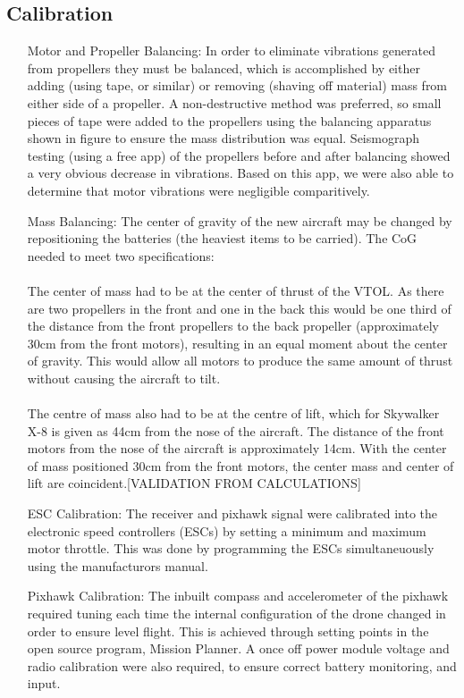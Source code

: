	

\subsection{Calibration}
\begin{itemize}
	\item[Motor and Propeller Balancing:] In order to eliminate vibrations generated from propellers they must be balanced, which is accomplished by either adding (using tape, or similar) or removing (shaving off material) mass from either side of a propeller. A non-destructive method was preferred, so small pieces of tape were added to the propellers using the balancing apparatus shown in figure  to ensure the mass distribution was equal.  Seismograph testing (using a free app) of the propellers before and after balancing showed a very obvious decrease in vibrations. Based on this app, we were also able to determine that motor vibrations were negligible comparitively.
	\item[Mass Balancing:]  The center of gravity of the new aircraft may be changed by repositioning the batteries (the heaviest items to be carried). The CoG needed to meet two specifications:
	\\\\The center of mass had to be at the center of thrust of the VTOL. As there are two propellers in the front and one in the back this would be one third of the distance from the front propellers to the back propeller (approximately 30cm from the front motors), resulting in an equal moment about the center of gravity. This would allow all motors to produce the same amount of thrust without causing the aircraft to tilt.
	\\\\The centre of mass also had to be at the centre of lift, which for Skywalker X-8 is given as 44cm from the nose of the aircraft. The distance of the front motors from the nose of the aircraft is approximately 14cm. With the center of mass positioned 30cm from the front motors, the center mass and center of lift are coincident.[VALIDATION FROM CALCULATIONS]
	\item[ESC Calibration:] The receiver and pixhawk signal were calibrated into the electronic speed controllers (ESCs) by setting a minimum and maximum motor throttle. This was done by programming the ESCs simultaneuously using the manufacturors manual. 
	\item[Pixhawk Calibration:] The inbuilt compass and accelerometer of the pixhawk required tuning each time the internal configuration of the drone changed in order to ensure level flight. This is achieved through setting points in the open source program, Mission Planner. A once off power module voltage and radio calibration were also required, to ensure correct battery monitoring, and input. 

\end{itemize}
